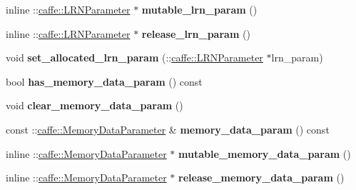 \begin{DoxyCompactItemize}
\item 
\mbox{\label{classcaffe_1_1_v1_layer_parameter_a531b73a246cdc271cf0d94500041c1dd}} 
inline \+::\mbox{\hyperlink{classcaffe_1_1_l_r_n_parameter}{caffe\+::\+L\+R\+N\+Parameter}} $\ast$ {\bfseries mutable\+\_\+lrn\+\_\+param} ()
\item 
\mbox{\label{classcaffe_1_1_v1_layer_parameter_a9018c76884e9f5663e75fd0641370df4}} 
inline \+::\mbox{\hyperlink{classcaffe_1_1_l_r_n_parameter}{caffe\+::\+L\+R\+N\+Parameter}} $\ast$ {\bfseries release\+\_\+lrn\+\_\+param} ()
\item 
\mbox{\label{classcaffe_1_1_v1_layer_parameter_a90fd6fc2625f1dead6155a52f6cbdd9e}} 
void {\bfseries set\+\_\+allocated\+\_\+lrn\+\_\+param} (\+::\mbox{\hyperlink{classcaffe_1_1_l_r_n_parameter}{caffe\+::\+L\+R\+N\+Parameter}} $\ast$lrn\+\_\+param)
\item 
\mbox{\label{classcaffe_1_1_v1_layer_parameter_a44a827a983a124084c7a9bfffd8fa124}} 
bool {\bfseries has\+\_\+memory\+\_\+data\+\_\+param} () const
\item 
\mbox{\label{classcaffe_1_1_v1_layer_parameter_a6018de577cb536a65ca29dde8671a9e6}} 
void {\bfseries clear\+\_\+memory\+\_\+data\+\_\+param} ()
\item 
\mbox{\label{classcaffe_1_1_v1_layer_parameter_ae49ec6f6ff7b77e20beff6637fd1d345}} 
const \+::\mbox{\hyperlink{classcaffe_1_1_memory_data_parameter}{caffe\+::\+Memory\+Data\+Parameter}} \& {\bfseries memory\+\_\+data\+\_\+param} () const
\item 
\mbox{\label{classcaffe_1_1_v1_layer_parameter_a7913d6528a5a3289b5247a4b331725f3}} 
inline \+::\mbox{\hyperlink{classcaffe_1_1_memory_data_parameter}{caffe\+::\+Memory\+Data\+Parameter}} $\ast$ {\bfseries mutable\+\_\+memory\+\_\+data\+\_\+param} ()
\item 
\mbox{\label{classcaffe_1_1_v1_layer_parameter_a848bd89629da42c5db4f1caca8050754}} 
inline \+::\mbox{\hyperlink{classcaffe_1_1_memory_data_parameter}{caffe\+::\+Memory\+Data\+Parameter}} $\ast$ {\bfseries release\+\_\+memory\+\_\+data\+\_\+param} ()

\end{DoxyCompactItemize}
